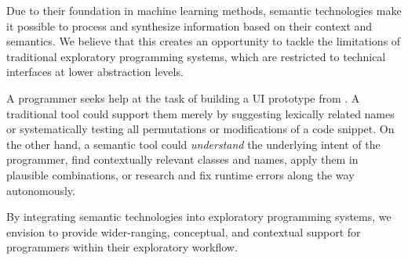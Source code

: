 \ParSep

Due to their foundation in machine learning methods, semantic technologies make it possible to process and synthesize information based on their context and semantics.
We believe that this creates an opportunity to tackle the limitations of traditional exploratory programming systems, which are restricted to technical interfaces at lower abstraction levels.

\begin{example}
	A programmer seeks help at the task of building a UI prototype from .
	A traditional tool could support them merely by suggesting lexically related names or systematically testing all permutations or modifications of a code snippet.
	On the other hand, a semantic tool could \emph{understand} the underlying intent of the programmer, find contextually relevant classes and names, apply them in plausible combinations, or research and fix runtime errors along the way autonomously.
\end{example}

By integrating semantic technologies into exploratory programming systems, we envision to provide wider-ranging, conceptual, and contextual support for programmers within their exploratory workflow.
